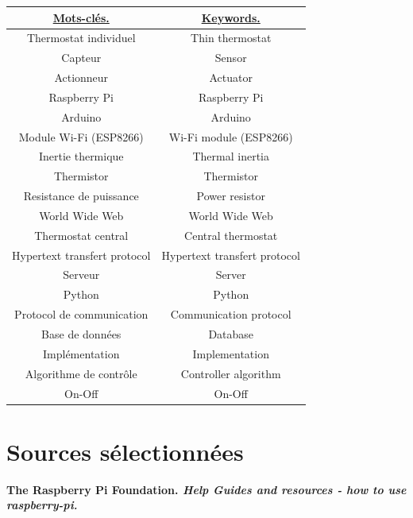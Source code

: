 \documentclass[12pt]{report}
\begin{document}
\vspace{1.5cm}
\begin{center}
\begin{tabular}{|c|c|}
\hline
{\uline{{\Huge Mots-cl\'{e}s.}}}&{\uline{{\Huge Keywords.}}}\\
\hline
{\large Thermostat individuel}&{\large Thin thermostat}\\
\hline
{\large Capteur}&{\large Sensor}\\
\hline
{\large Actionneur}&{\large Actuator}\\
\hline
{\large Raspberry Pi}&{\large Raspberry Pi}\\
\hline
{\large Arduino}&{\large Arduino}\\
\hline
{\large Module Wi-Fi (ESP8266)}&{\large Wi-Fi module (ESP8266)}\\
\hline
{\large Inertie thermique}&{\large Thermal inertia}\\
\hline
{\large Thermistor}&{\large Thermistor}\\
\hline
{\large Resistance de puissance}&{\large Power resistor}\\
\hline
{\large World Wide Web}&{\large World Wide Web}\\
\hline
{\large Thermostat central}&{\large Central thermostat}\\
\hline
{\large Hypertext transfert protocol}&{\large Hypertext transfert protocol}\\
\hline
{\large Serveur}&{\large Server}\\
\hline
{\large Python}&{\large Python}\\
\hline
{\large Protocol de communication}&{\large Communication protocol}\\
\hline
{\large Base de donn\'{e}es}&{\large Database}\\
\hline
{\large Impl\'{e}mentation}&{\large Implementation}\\
\hline
{\large Algorithme de contr\^{o}le}&{\large Controller algorithm}\\
\hline
{\large On-Off}&{\large On-Off}\\ 
\hline
\end{tabular}
\end{center}
\section{Sources s\'{e}lectionn\'{e}es}
\textbf{The Raspberry Pi Foundation. \textit{Help Guides and resources - how to
use raspberry-pi. }} \cite{_raspberry_????}
\end{document}
